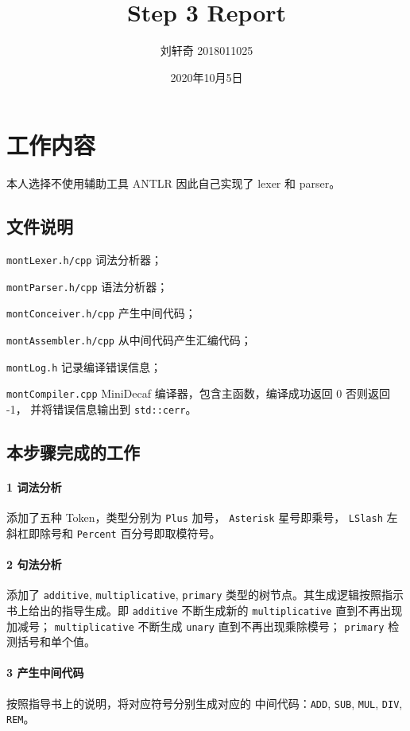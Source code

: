 \documentclass[UTF8]{ctexart}
\title{Step 3 Report}
\author{刘轩奇 2018011025}
\date{2020年10月5日}
\newcommand{\T}[1]{\texttt{{#1}}}
\begin{document}
    \maketitle
    \section{工作内容}
        本人选择不使用辅助工具 ANTLR 因此自己实现了 lexer 和 parser。
        \subsection{文件说明} 
            \T{montLexer.h/cpp} 词法分析器；

            \T{montParser.h/cpp} 语法分析器；

            \T{montConceiver.h/cpp} 产生中间代码；

            \T{montAssembler.h/cpp} 从中间代码产生汇编代码；
            
            \T{montLog.h} 记录编译错误信息；

            \T{montCompiler.cpp} MiniDecaf 编译器，包含主函数，编译成功返回 0 否则返回 -1，
            并将错误信息输出到 \T{std::cerr}。
        
        \subsection{本步骤完成的工作}

            \paragraph{1 词法分析} 添加了五种 Token，类型分别为 \T{Plus} 加号，
            \T{Asterisk} 星号即乘号， \T{LSlash} 左斜杠即除号和 \T{Percent} 百分号即取模符号。

            \paragraph{2 句法分析} 添加了 \T{additive}, \T{multiplicative}, \T{primary} 
            类型的树节点。其生成逻辑按照指示书上给出的指导生成。即 \T{additive} 不断生成新的 
            \T{multiplicative} 直到不再出现加减号； \T{multiplicative} 不断生成 \T{unary} 
            直到不再出现乘除模号； \T{primary} 检测括号和单个值。

            \paragraph{3 产生中间代码} 按照指导书上的说明，将对应符号分别生成对应的
            中间代码：\T{ADD}, \T{SUB}, \T{MUL}, \T{DIV}, \T{REM}。
\end{document}
